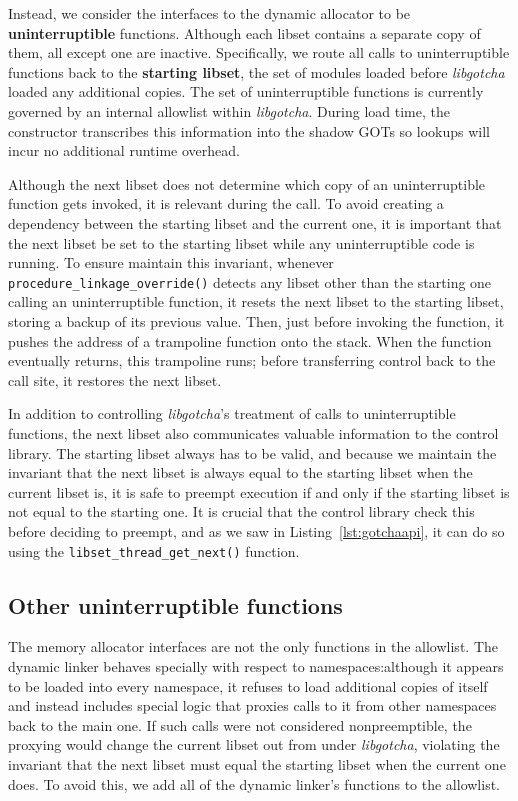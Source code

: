 Instead, we consider the interfaces to the dynamic allocator to be
\textbf{uninterruptible} functions.  Although each libset contains a separate copy of
them, all except one are inactive.  Specifically, we route all calls to
uninterruptible functions back to the \textbf{starting libset}, the set of modules
loaded before \textit{libgotcha} loaded any additional copies.  The set of
uninterruptible functions is currently governed by an internal allowlist within
\textit{libgotcha}.  During load time, the constructor transcribes this information
into the shadow GOTs so lookups will incur no additional runtime overhead.

\begin{sloppypar}
Although the next libset does not determine which copy of an uninterruptible function
gets invoked, it is relevant during the call.  To avoid creating a dependency between
the starting libset and the current one, it is important that the next libset be set
to the starting libset while any uninterruptible code is running.  To ensure maintain
this invariant, whenever \texttt{procedure\_linkage\_override()} detects any libset
other than the starting one calling an uninterruptible function, it resets the next
libset to the starting libset, storing a backup of its previous value.  Then, just
before invoking the function, it pushes the address of a trampoline function onto the
stack.  When the function eventually returns, this trampoline runs; before
transferring control back to the call site, it restores the next libset.
\end{sloppypar}

In addition to controlling \textit{libgotcha}'s treatment of calls to uninterruptible
functions, the next libset also communicates valuable information to the control
library.  The starting libset always has to be valid, and because we maintain the
invariant that the next libset is always equal to the starting libset when the
current libset is, it is safe to preempt execution if and only if the starting libset
is not equal to the starting one.  It is crucial that the control library check this
before deciding to preempt, and as we saw in Listing~\ref{lst:gotchaapi}, it can do
so using the \texttt{libset\_thread\_get\_next()} function.


\subsection{Other uninterruptible functions}

The memory allocator interfaces are not the only functions in the allowlist.  The
dynamic linker behaves specially with respect to namespaces:\@ although it appears to
be loaded into every namespace, it refuses to load additional copies of itself and
instead includes special logic that proxies calls to it from other namespaces back to
the main one.  If such calls were not considered nonpreemptible, the proxying would
change the current libset out from under \textit{libgotcha}, violating the invariant
that the next libset must equal the starting libset when the current one does.  To
avoid this, we add all of the dynamic linker's functions to the allowlist.

